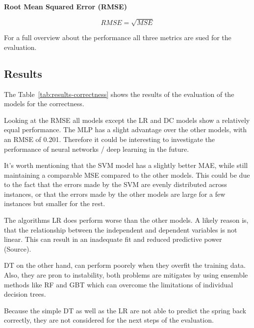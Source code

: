 \textbf{Root Mean Squared Error (RMSE)}

\begin{tcolorbox}[arc=0pt,boxrule=0.5pt]
    \begin{equation}
        \label{eq:rmse}
        RMSE = \sqrt{MSE}
    \end{equation}
\end{tcolorbox}

For a full overview about the performance all three metrics are sued for the
evaluation.

\subsection{Results}\label{subsec:results}
The Table~\ref{tab:results-correctness} shows the results of the
evaluation of the models for the correctness.

Looking at the \ac{RMSE} all models except the \ac{LR} and \ac{DC} models show a
relatively equal performance.
The \ac{MLP} has a slight advantage over the other models, with an \ac{RMSE} of 0.201.
Therefore it could be interesting to investigate the performance of neural networks /
deep learning in the future.

It's worth mentioning that the \ac{SVM} model has a slightly better \ac{MAE}, while
still maintaining a comparable \ac{MSE} compared to the other models.
This could be due to the fact that the errors made by the \ac{SVM} are evenly
distributed across instances, or that the errors made by the other models are large for
a few instances but smaller for the rest.

The algorithms \ac{LR} does perform worse than the other models.
A likely reason is, that the relationship between the independent and dependent
variables is not linear.
This can result in an inadequate fit and reduced predictive power (Source).

\ac{DT} on the other hand, can perform poorely when they overfit the training data.
Also, they are pron to instability, both problems are mitigates by using ensemble methods
like \ac{RF} and \ac{GBT} which can overcome the limitations of individual
decision trees.

Because the simple \ac{DT} as well as the \ac{LR} are not able to predict the
spring back correctly, they are not considered for the next steps of the evaluation.

